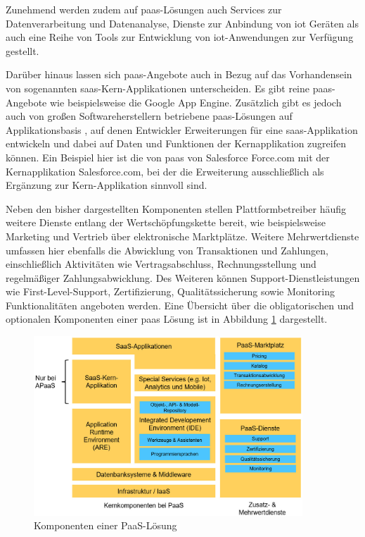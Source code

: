 Zunehmend werden zudem auf \ac{paas}-Lösungen auch Services zur Datenverarbeitung und Datenanalyse, Dienste zur Anbindung von \ac{iot} Geräten als auch eine Reihe von Tools zur Entwicklung von \ac{iot}-Anwendungen zur Verfügung gestellt. \autocite[Vgl.][]{IBM2023}

Darüber hinaus lassen sich \ac{paas}-Angebote auch in Bezug auf das Vorhandensein von sogenannten \ac{saas}-Kern-Applikationen unterscheiden. Es gibt reine \ac{paas}-Angebote wie beispielsweise die Google App Engine. Zusätzlich gibt es jedoch auch von großen Softwareherstellern betriebene \ac{paas}-Lösungen auf Applikationsbasis , auf denen Entwickler Erweiterungen für eine \ac{saas}-Applikation entwickeln und dabei auf Daten und Funktionen der Kernapplikation zugreifen können. Ein Beispiel hier ist die von \ac{paas} von Salesforce Force.com mit der Kernapplikation Salesforce.com, bei der die Erweiterung ausschließlich als Ergänzung zur Kern-Applikation sinnvoll sind. \autocite[Vgl.][S. 371]{BEIMBORN2011} 

Neben den bisher dargestellten Komponenten stellen Plattformbetreiber häufig weitere Dienste entlang der Wertschöpfungskette bereit, wie beispielsweise Marketing und Vertrieb über elektronische Marktplätze. Weitere Mehrwertdienste umfassen hier ebenfalls die Abwicklung von Transaktionen und Zahlungen, einschließlich Aktivitäten wie Vertragsabschluss, Rechnungsstellung und regelmäßiger Zahlungsabwicklung. Des Weiteren können Support-Dienstleistungen wie First-Level-Support, Zertifizierung, Qualitätssicherung sowie Monitoring Funktionalitäten angeboten werden. \autocite[Vgl.][S. 598]{HAHN2016} Eine Übersicht über die obligatorischen und optionalen Komponenten einer \ac{paas} Lösung ist in Abbildung \ref{fig:PaaSK} dargestellt.


\begin{figure}[h]
    \centering
    \includegraphics[width=0.9\textwidth]{img/PaaS_Komponenten.jpg}
    \caption[Komponenten einer PaaS-Lösung]{Komponenten einer PaaS-Lösung\autocite{PaaSK}}
    \label{fig:PaaSK}
\end{figure}

